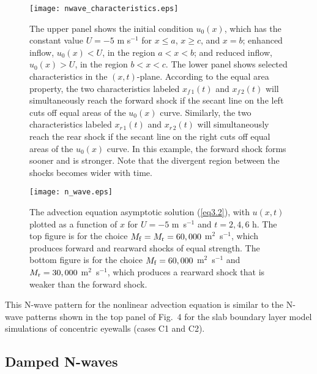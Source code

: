 \documentclass[10pt]{article}
\begin{document}
\begin{figure}[!t]             %
\centerline{\texttt{[image: nwave\_characteristics.eps]}}
\caption{The upper panel shows the initial condition $u_0(x)$, which
has the constant value $U=-5$ m s$^{-1}$ for $x\leq a$, $x\geq c$, and
$x=b$;
enhanced inflow, $u_0(x)<U$, in the region $a<x<b$; and reduced
inflow, $u_0(x)>U$, in the region $b<x<c$. The lower
panel shows selected characteristics in the $(x,t)$-plane. According
to the equal area property, the two characteristics labeled $x_{f\,1}(t)$
and $x_{f\,2}(t)$ will simultaneously reach the forward shock if the
secant line on the left cuts off equal areas of the $u_0(x)$ curve.
Similarly, the two characteristics labeled $x_{r\,1}(t)$ and $x_{r\,2}(t)$
will simultaneously reach the rear shock if the secant line on the right
cuts off equal areas of the $u_0(x)$ curve. In this example, the forward
shock forms sooner and is stronger. Note that the divergent region between
the shocks becomes wider with time.}
\end{figure}


\begin{figure}[!t]             %
\centerline{\texttt{[image: n\_wave.eps]}}
\caption{The advection equation asymptotic solution (\ref{eq3.2}),
with $u(x,t)$ plotted as a function of $x$ for $U=-5$ m\, s$^{-1}$
and $t=2,4,6$ h. The top figure is for the choice
$M_{\rm f}=M_{\rm r}=60,000$ m$^2$~s$^{-1}$, which produces forward
and rearward shocks of equal strength. The bottom figure is for the
choice $M_{\rm f}=60,000$ m$^2$~s$^{-1}$ and $M_{\rm r}=30,000$ m$^2$~s$^{-1}$,
which produces a rearward shock that is weaker than the forward shock.}
\end{figure}


This N-wave pattern for the nonlinear advection equation is similar to
the N-wave patterns shown in the top panel of Fig.~4 for the slab boundary
layer model simulations of concentric eyewalls (cases C1 and C2).



\subsection{Damped N-waves}
\end{document}
